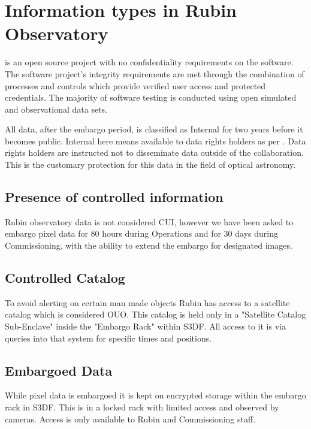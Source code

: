 \section{Information types in Rubin Observatory} \label{sec:infotypes}

\VRO is an open source project with no confidentiality requirements on the \gls{software}.
The \gls{software} project’s integrity requirements are met through the combination of
processes and controls which provide verified user access and protected credentials.
The majority of \gls{software} testing is conducted using open simulated and observational data sets.

All data, after the embargo period,  is classified as Internal for two years before it becomes public.
Internal here means available to data rights holders as per .
Data rights holders are instructed not to disseminate data outside of the collaboration.
This is the customary protection for this data in the field of optical astronomy.

\subsection{Presence of controlled information}\label{sec:cui}
Rubin observatory data is not considered \gls{CUI}, however we have been asked to embargo pixel data for 80 hours during \gls{Operations} and for 30 days during Commissioning, with the ability to extend the embargo for designated images.

\subsection{Controlled Catalog}\label{sec:controllescat}
To avoid alerting on certain man made objects Rubin has access to a satellite catalog which is considered \gls{OUO}.
This catalog is held only in a "Satellite Catalog Sub-Enclave" inside the "Embargo Rack" within \gls{S3DF}.
All access to it is via queries into that system for specific times and positions.

\subsection{Embargoed Data} \label{sec:embargo}
While pixel data is embargoed it is kept on encrypted storage within the embargo rack in \gls{S3DF}.
This is in a locked rack with limited access and observed by cameras.
Access is only available to Rubin and \gls{Commissioning} staff.

